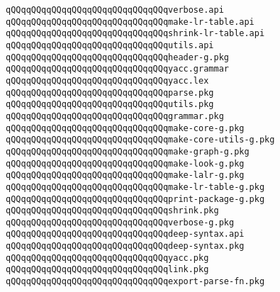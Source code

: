 \verb|qQQqqQQqqQQqqQQqqQQqqQQqqQQqqQQqverbose.api|\newline
\verb|qQQqqQQqqQQqqQQqqQQqqQQqqQQqqQQqmake-lr-table.api|\newline
\verb|qQQqqQQqqQQqqQQqqQQqqQQqqQQqqQQqshrink-lr-table.api|\newline
\newline
\verb|qQQqqQQqqQQqqQQqqQQqqQQqqQQqqQQqutils.api|\newline
\verb|qQQqqQQqqQQqqQQqqQQqqQQqqQQqqQQqheader-g.pkg|\newline
\verb|qQQqqQQqqQQqqQQqqQQqqQQqqQQqqQQqyacc.grammar|\newline
\verb|qQQqqQQqqQQqqQQqqQQqqQQqqQQqqQQqyacc.lex|\newline
\verb|qQQqqQQqqQQqqQQqqQQqqQQqqQQqqQQqparse.pkg|\newline
\newline
\verb|qQQqqQQqqQQqqQQqqQQqqQQqqQQqqQQqutils.pkg|\newline
\verb|qQQqqQQqqQQqqQQqqQQqqQQqqQQqqQQqgrammar.pkg|\newline
\verb|qQQqqQQqqQQqqQQqqQQqqQQqqQQqqQQqmake-core-g.pkg|\newline
\verb|qQQqqQQqqQQqqQQqqQQqqQQqqQQqqQQqmake-core-utils-g.pkg|\newline
\verb|qQQqqQQqqQQqqQQqqQQqqQQqqQQqqQQqmake-graph-g.pkg|\newline
\verb|qQQqqQQqqQQqqQQqqQQqqQQqqQQqqQQqmake-look-g.pkg|\newline
\verb|qQQqqQQqqQQqqQQqqQQqqQQqqQQqqQQqmake-lalr-g.pkg|\newline
\verb|qQQqqQQqqQQqqQQqqQQqqQQqqQQqqQQqmake-lr-table-g.pkg|\newline
\verb|qQQqqQQqqQQqqQQqqQQqqQQqqQQqqQQqprint-package-g.pkg|\newline
\verb|qQQqqQQqqQQqqQQqqQQqqQQqqQQqqQQqshrink.pkg|\newline
\verb|qQQqqQQqqQQqqQQqqQQqqQQqqQQqqQQqverbose-g.pkg|\newline
\newline
\verb|qQQqqQQqqQQqqQQqqQQqqQQqqQQqqQQqdeep-syntax.api|\newline
\verb|qQQqqQQqqQQqqQQqqQQqqQQqqQQqqQQqdeep-syntax.pkg|\newline
\verb|qQQqqQQqqQQqqQQqqQQqqQQqqQQqqQQqyacc.pkg|\newline
\verb|qQQqqQQqqQQqqQQqqQQqqQQqqQQqqQQqlink.pkg|\newline
\verb|qQQqqQQqqQQqqQQqqQQqqQQqqQQqqQQqexport-parse-fn.pkg|\newline

